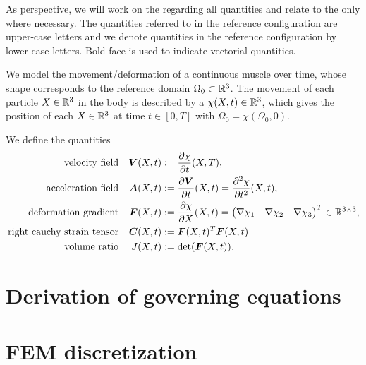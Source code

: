\documentclass[a4paper,12pt]{article}
\newcommand{\Or}{\Omega_0}
\newcommand{\m}[1]{\ensuremath{\left(\begin{matrix}#1\end{matrix}\right)}}
\begin{document}
As perspective, we will work on the  regarding all quantities and relate to the  only where necessary.
The quantities referred to in the reference configuration are upper-case letters and we denote quantities in the reference configuration by lower-case letters.
Bold face is used to indicate vectorial quantities.

We model the movement/deformation of a continuous muscle over time, whose shape corresponds to the reference domain $\Or\subset\R^3$.
The movement of each particle $X\in\mathbb{R}^3$ in the body is described by a  $\chi(X,t)\in\mathbb{R}^3$, which gives the position of each $X\in\mathbb{R}^3$ at time
$t\in[0,T]$ with $\Or = \chi(\Or,0)$.

We define the quantities
\begin{align}
	\text{velocity field} && \vV(X,t) &:= \d{\chi}{t}(X,T),\\
	\text{acceleration field} && \vA(X,t) &:= \d{\vV}{t}(X,t) = \dd{\chi}{t}(X,t),\\
	\text{deformation gradient} && \vF(X,t) &:= \d{\chi}{X}(X,t) = \m{\nabla \chi_1 & \nabla \chi_2 & \nabla \chi_3}^T \in \R^{3\times 3},\\
	\text{right cauchy strain tensor} && \vC(X,t) &:= \vF(X,t)^T\vF(X,t)\\
	\text{volume ratio} && J(X,t) &:= \det(\vF(X,t)).
\end{align}

\section{Derivation of governing equations}


\section{FEM discretization}
\end{document}
